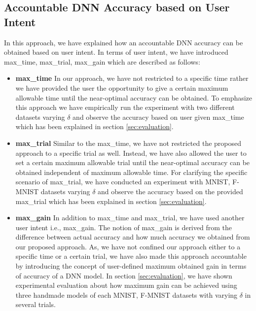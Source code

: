 \subsection{Accountable DNN Accuracy based on User Intent}
In this approach, we have explained how an accountable DNN accuracy can be obtained based on user intent. In terms of user intent, we have introduced max\_time, max\_trial, max\_gain which are described as follows:
\begin{itemize}
	\item \textbf{max\_time} In our approach, we have not restricted to a specific time rather we have provided the user the opportunity to give a certain maximum allowable time until the near-optimal accuracy can be obtained. To emphasize this approach we have empirically run the experiment with two different datasets varying $\delta$ and observe the accuracy based on user given max\_time which has been explained in section \ref{sec:evaluation}. 
	\item \textbf{max\_trial} Similar to the max\_time, we have not restricted the proposed approach to a specific trial as well. Instead, we have also allowed the user to set a certain maximum allowable trial until the near-optimal accuracy can be obtained independent of maximum allowable time. For clarifying the specific scenario of max\_trial, we have conducted an experiment with MNIST, F-MNIST datasets varying $\delta$ and observe the accuracy based on the provided max\_trial which has been explained in section \ref{sec:evaluation}.
	\item \textbf{max\_gain} In addition to max\_time and max\_trial, we have used another user intent i.e., max\_gain. The notion of max\_gain is derived from the difference between actual accuracy and how much accuracy we obtained from our proposed approach. As, we have not confined our approach either to a specific time or a certain trial, we have also made this approach accountable by introducing the concept of user-defined maximum obtained gain in terms of accuracy of a DNN model. In section \ref{sec:evaluation}, we have shown experimental evaluation about how maximum gain can be achieved using three handmade models of each MNIST, F-MNIST datasets with varying $\delta$ in several trials.          
\end{itemize}
